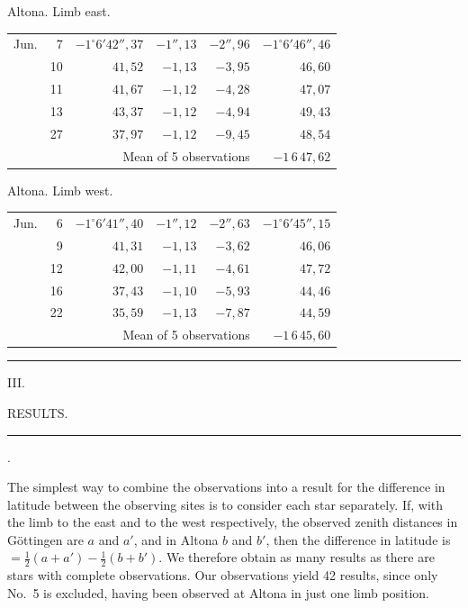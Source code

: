\noindent\begin{minipage}[t]{.495\textwidth}\centering Altona. Limb east.\par\smallskip
{\scriptsize\setlength{\tabcolsep}{1pt}\renewcommand{\arraystretch}{1.2}\begin{tabular}{lr|r|r|r|r|}
Jun.&7&$-1^\circ6'42''{,}37$&$-1''{,}13$&$-2''{,}96$&$-1^\circ6'46''{,}46$\\
&10&$41{,}52$&$-1{,}13$&$-3{,}95$&$46{,}60$\\
&11&$41{,}67$&$-1{,}12$&$-4{,}28$&$47{,}07$\\
&13&$43{,}37$&$-1{,}12$&$-4{,}94$&$49{,}43$\\
&27&$37{,}97$&$-1{,}12$&$-9{,}45$&$48{,}54$\\
\cline{6-6}\multicolumn{5}{r}{Mean of 5 observations}&$-1\,6\,47{,}62$
\end{tabular}}\end{minipage}\hfill\begin{minipage}[t]{.495\textwidth}\centering Altona. Limb west.\par\smallskip
{\scriptsize\setlength{\tabcolsep}{1pt}\renewcommand{\arraystretch}{1.2}\begin{tabular}{lr|r|r|r|r}
Jun.&6&$-1^\circ6'41''{,}40$&$-1''{,}12$&$-2''{,}63$&$-1^\circ6'45''{,}15$\\
&9&$41{,}31$&$-1{,}13$&$-3{,}62$&$46{,}06$\\
&12&$42{,}00$&$-1{,}11$&$-4{,}61$&$47{,}72$\\
&16&$37{,}43$&$-1{,}10$&$-5{,}93$&$44{,}46$\\
&22&$35{,}59$&$-1{,}13$&$-7{,}87$&$44{,}59$\\
\cline{6-6}\multicolumn{5}{r}{Mean of 5 observations}&$-1\,6\,45{,}60$
\end{tabular}}\end{minipage}
\par\vspace{4mm}
\begin{center}\rule{.23\textwidth}{.4pt}\end{center}

\clearpage
\vspace*{18mm}
\begin{center}
{\large III.}\par\medskip
{\Large RESULTS.}\par\medskip
\rule{.09\textwidth}{.4pt}\par{}.
\end{center}

The simplest way to combine the observations into a result for
the difference in latitude between the observing sites is to consider each star
separately. If, with the limb to the east and to the west respectively,
the observed zenith distances in Göttingen are $a$ and $a'$, and in Altona $b$ and $b'$, then
the difference in latitude is $=\frac12(a+a')-\frac12(b+b')$. We therefore obtain as
many results as there are stars with complete observations. Our observations yield
42 results, since only No.\ 5 is excluded, having been observed at Altona in just one limb position.

